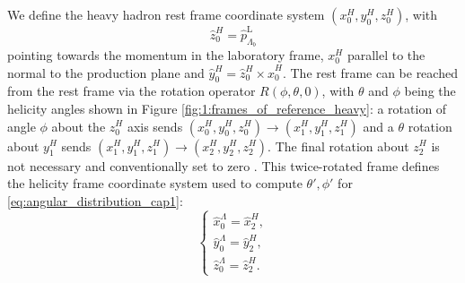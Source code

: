 We define the heavy hadron \lbz rest frame coordinate system $(x_0^H, y_0^H, z_0^H)$, with
\begin{equation}
	\hat{z}_0^H = \hat{p}_{\Lambda_b}^\text{L}
\end{equation}
pointing towards the \lbz momentum in the laboratory frame, $x_0^H$ parallel to the normal to the \lbz production plane and $\hat{y}_0^H = \hat{z}_0^H \times \hat{x}_0^H$.
The \slambda rest frame can be reached from the \lbz rest frame via the rotation operator $R(\phi,\theta,0)$, with $\theta$ and $\phi$ being the \lz helicity angles shown in Figure \ref{fig:1:frames_of_reference_heavy}:
a rotation of angle $\phi$ about the $z_0^H$ axis sends
$(x_0^H, y_0^H, z_0^H) \rightarrow (x_1^H, y_1^H, z_1^H)$ and a $\theta$ rotation about  $y_1^H$ sends $(x_1^H, y_1^H, z_1^H) \rightarrow (x_2^H, y_2^H, z_2^H)$.
The final rotation about $z_2^H$ is not necessary and conventionally set to zero \cite{Richman:153636} \cite{Jurik:2206806}.
This twice-rotated frame defines the \slambda helicity frame coordinate system used to compute $\theta',\phi'$ for \eqref{eq:angular_distribution_cap1}:
\begin{equation}
	\begin{cases}
		\hat{x}_0^\Lambda = \hat{x}_2^H, \\
		\hat{y}_0^\Lambda = \hat{y}_2^H, \\
		\hat{z}_0^\Lambda = \hat{z}_2^H.
	\end{cases}
\end{equation}


